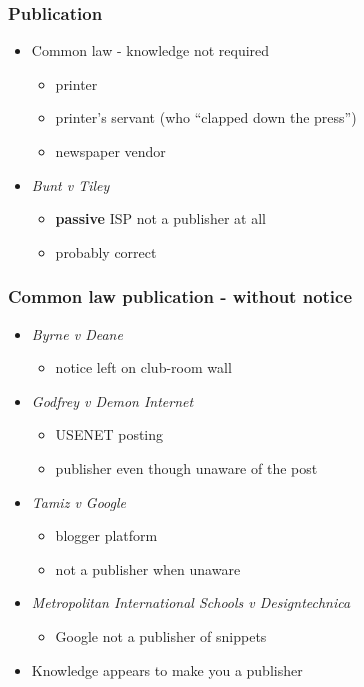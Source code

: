 \documentclass[ignorenonframetext,]{beamer}
\begin{document}
\begin{frame}
\frametitle{Publication}

\begin{itemize}
\item Common law - knowledge not required
  \begin{itemize}
  \item printer
  \item printer's servant (who ``clapped down the press'')
  \item newspaper vendor
  \end{itemize}
\item {\it Bunt v Tiley}
  \begin{itemize}
  \item {\bf passive} ISP not a publisher at all 
  \item probably correct
  \end{itemize}
\end{itemize}

\end{frame}


\begin{frame}
\frametitle{Common law publication - without notice}
  \begin{itemize}
    \item {\it Byrne v Deane}
      \begin{itemize}
      \item notice left on club-room wall
      \end{itemize}
    \item {\it Godfrey v Demon Internet}
      \begin{itemize}
      \item USENET posting
      \item publisher even though unaware of the post
      \end{itemize}
    \item {\it Tamiz v Google}
      \begin{itemize}
      \item blogger platform
      \item not a publisher when unaware
      \end{itemize}
    \item {\it Metropolitan International Schools v Designtechnica}
      \begin{itemize}
      \item Google not a publisher of snippets
      \end{itemize}
    \item Knowledge appears to make you a publisher
  \end{itemize}
 
\end{frame}
\end{document}
